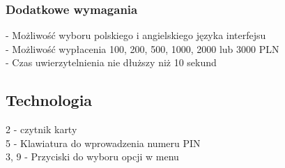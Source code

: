 \documentclass[10pt, a4paper]{article}
\begin{document}
\subsubsection*{Dodatkowe wymagania}
- Możliwość wyboru polskiego i angielskiego języka interfejsu \\
- Możliwość wypłacenia 100, 200, 500, 1000, 2000 lub 3000 PLN \\
- Czas uwierzytelnienia nie dłuższy niż 10 sekund
\subsection*{Technologia}
2 - czytnik karty \\
5 - Klawiatura do wprowadzenia numeru PIN \\
3, 9 - Przyciski do wyboru opcji w menu \\
\end{document}
